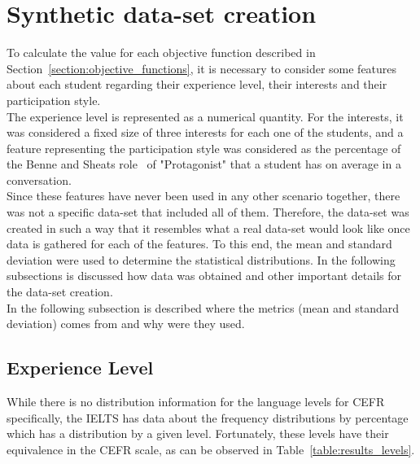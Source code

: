 \section{Synthetic data-set creation}
\label{section:synthetic_dataset}

To calculate the value for each objective function described in Section~\ref{section:objective_functions}, it is necessary to consider some features about each student regarding their experience level, their interests and their participation style.\\

The experience level is represented as a numerical quantity. For the interests, it was considered a fixed size of three interests for each one of the students, and a feature representing the participation style was considered as the percentage of the Benne and Sheats role~\cite{FunctionalRoles} of "Protagonist" that a student has on average in a conversation.\\

Since these features have never been used in any other scenario together, there was not a specific data-set that included all of them. Therefore, the data-set was created in such a way that it resembles what a real data-set would look like once data is gathered for each of the features. To this end, the mean and standard deviation were used to determine the statistical distributions. In the following subsections is discussed how data was obtained and other important details for the data-set creation.\\

In the following subsection is described where the metrics (mean and standard deviation) comes from and why were they used.\\

\subsection{Experience Level} 

While there is no distribution information for the language levels for CEFR specifically, the IELTS has data about the frequency distributions by percentage~\cite{ielts_demographic_data_2018} which has a distribution by a given level. Fortunately, these levels have their equivalence in the CEFR scale, as can be observed in Table~\ref{table:results_levels}.\\

